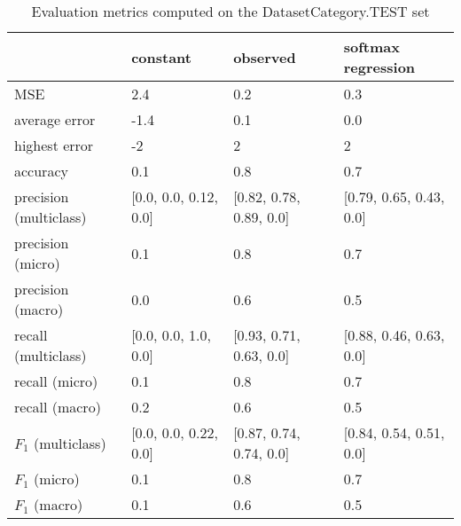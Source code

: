 \begin{table}[H]
\caption{Evaluation metrics computed on the DatasetCategory.TEST set}
\label{tbl:sais_eval_DatasetCategory}
\begin{tabular}{llll}
\toprule
 & constant & observed & softmax regression \\
\midrule
MSE & 2.4 & 0.2 & 0.3 \\
average error & -1.4 & 0.1 & 0.0 \\
highest error & -2 & 2 & 2 \\
accuracy & 0.1 & 0.8 & 0.7 \\
precision (multiclass) & [0.0, 0.0, 0.12, 0.0] & [0.82, 0.78, 0.89, 0.0] & [0.79, 0.65, 0.43, 0.0] \\
precision (micro) & 0.1 & 0.8 & 0.7 \\
precision (macro) & 0.0 & 0.6 & 0.5 \\
recall (multiclass) & [0.0, 0.0, 1.0, 0.0] & [0.93, 0.71, 0.63, 0.0] & [0.88, 0.46, 0.63, 0.0] \\
recall (micro) & 0.1 & 0.8 & 0.7 \\
recall (macro) & 0.2 & 0.6 & 0.5 \\
$F_1$ (multiclass) & [0.0, 0.0, 0.22, 0.0] & [0.87, 0.74, 0.74, 0.0] & [0.84, 0.54, 0.51, 0.0] \\
$F_1$ (micro) & 0.1 & 0.8 & 0.7 \\
$F_1$ (macro) & 0.1 & 0.6 & 0.5 \\
\bottomrule
\end{tabular}
\end{table}
